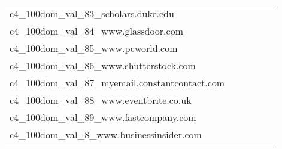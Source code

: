 {\begin{longtable}{m{6cm}m{1.7cm}m{1.7cm}m{1.7cm}m{1.7cm}m{1.7cm}}
	c4\_100dom\_val\_83\_scholars.duke.edu  & \colorbox[HTML]{fefee3}{\makebox[\mywidth][c]{8.72}} & \colorbox[HTML]{f8fcc2}{\makebox[\mywidth][c]{8.43}} & \colorbox[HTML]{ffffe5}{\makebox[\mywidth][c]{9.03}} & \colorbox[HTML]{daf0a4}{\makebox[\mywidth][c]{8.32}} & \colorbox[HTML]{77c578}{\makebox[\mywidth][c]{8.21}}\\
	c4\_100dom\_val\_84\_www.glassdoor.com  & \colorbox[HTML]{ffffe5}{\makebox[\mywidth][c]{16.64}} & \colorbox[HTML]{d4eea0}{\makebox[\mywidth][c]{15.97}} & \colorbox[HTML]{ffffe5}{\makebox[\mywidth][c]{16.99}} & \colorbox[HTML]{ddf1a6}{\makebox[\mywidth][c]{16.00}} & \colorbox[HTML]{77c578}{\makebox[\mywidth][c]{15.83}}\\
	c4\_100dom\_val\_85\_www.pcworld.com  & \colorbox[HTML]{fefee0}{\makebox[\mywidth][c]{12.34}} & \colorbox[HTML]{ebf7b0}{\makebox[\mywidth][c]{11.95}} & \colorbox[HTML]{ffffe5}{\makebox[\mywidth][c]{12.95}} & \colorbox[HTML]{dff2a7}{\makebox[\mywidth][c]{11.90}} & \colorbox[HTML]{77c578}{\makebox[\mywidth][c]{11.72}}\\
	c4\_100dom\_val\_86\_www.shutterstock.com  & \colorbox[HTML]{bbe395}{\makebox[\mywidth][c]{8.70}} & \colorbox[HTML]{e4f4ab}{\makebox[\mywidth][c]{8.89}} & \colorbox[HTML]{ffffe5}{\makebox[\mywidth][c]{10.75}} & \colorbox[HTML]{a2d889}{\makebox[\mywidth][c]{8.62}} & \colorbox[HTML]{77c578}{\makebox[\mywidth][c]{8.52}}\\
	c4\_100dom\_val\_87\_myemail.constantcontact.com  & \colorbox[HTML]{fdfedc}{\makebox[\mywidth][c]{14.59}} & \colorbox[HTML]{ebf7b0}{\makebox[\mywidth][c]{14.24}} & \colorbox[HTML]{ffffe5}{\makebox[\mywidth][c]{15.32}} & \colorbox[HTML]{dff2a7}{\makebox[\mywidth][c]{14.18}} & \colorbox[HTML]{77c578}{\makebox[\mywidth][c]{13.98}}\\
	c4\_100dom\_val\_88\_www.eventbrite.co.uk  & \colorbox[HTML]{fefee3}{\makebox[\mywidth][c]{14.47}} & \colorbox[HTML]{e7f5ad}{\makebox[\mywidth][c]{13.99}} & \colorbox[HTML]{ffffe5}{\makebox[\mywidth][c]{14.89}} & \colorbox[HTML]{e7f5ad}{\makebox[\mywidth][c]{13.98}} & \colorbox[HTML]{77c578}{\makebox[\mywidth][c]{13.79}}\\
	c4\_100dom\_val\_89\_www.fastcompany.com  & \colorbox[HTML]{fbfdd0}{\makebox[\mywidth][c]{14.24}} & \colorbox[HTML]{c8e89a}{\makebox[\mywidth][c]{13.75}} & \colorbox[HTML]{ffffe5}{\makebox[\mywidth][c]{15.52}} & \colorbox[HTML]{daf0a4}{\makebox[\mywidth][c]{13.82}} & \colorbox[HTML]{77c578}{\makebox[\mywidth][c]{13.56}}\\
	c4\_100dom\_val\_8\_www.businessinsider.com  & \colorbox[HTML]{fefee3}{\makebox[\mywidth][c]{10.97}} & \colorbox[HTML]{f7fcbe}{\makebox[\mywidth][c]{10.69}} & \colorbox[HTML]{ffffe5}{\makebox[\mywidth][c]{11.35}} & \colorbox[HTML]{b8e293}{\makebox[\mywidth][c]{10.52}} & \colorbox[HTML]{77c578}{\makebox[\mywidth][c]{10.46}}\\

\end{longtable}}
